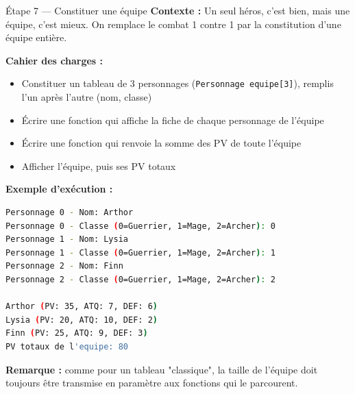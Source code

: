 \begin{UPSTIManipulation}{Étape 7 — Constituer une équipe}
  \textbf{Contexte :} Un seul héros, c'est bien, mais une équipe, c'est mieux. On remplace le
  combat 1 contre 1 par la constitution d'une équipe entière.

  \textbf{Cahier des charges :}
  \begin{itemize}
    \item Constituer un tableau de 3 personnages (\texttt{Personnage equipe[3]}), remplis l'un
      après l'autre (nom, classe)
    \item Écrire une fonction qui affiche la fiche de chaque personnage de l'équipe
    \item Écrire une fonction qui renvoie la somme des PV de toute l'équipe
    \item Afficher l'équipe, puis ses PV totaux
  \end{itemize}

  \textbf{Exemple d'exécution :}
  \begin{lstlisting}[language=bash]
Personnage 0 - Nom: Arthor
Personnage 0 - Classe (0=Guerrier, 1=Mage, 2=Archer): 0
Personnage 1 - Nom: Lysia
Personnage 1 - Classe (0=Guerrier, 1=Mage, 2=Archer): 1
Personnage 2 - Nom: Finn
Personnage 2 - Classe (0=Guerrier, 1=Mage, 2=Archer): 2

Arthor (PV: 35, ATQ: 7, DEF: 6)
Lysia (PV: 20, ATQ: 10, DEF: 2)
Finn (PV: 25, ATQ: 9, DEF: 3)
PV totaux de l'equipe: 80
  \end{lstlisting}

  \textbf{Remarque :} comme pour un tableau "classique", la taille de l'équipe doit toujours
  être transmise en paramètre aux fonctions qui le parcourent.

\end{UPSTIManipulation}

